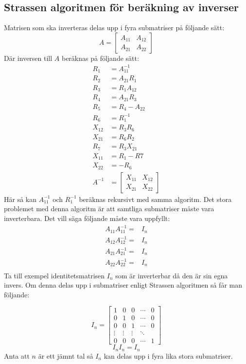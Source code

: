 \subsection{Strassen algoritmen för beräkning av inverser}
\label{sec:inverse_nackdelar}
Matrisen som ska inverteras delas upp i fyra submatriser på följande sätt:
$$A=\begin{bmatrix}
A_{11} & A_{12} \\
A_{21}& A_{22}
 \end{bmatrix}
 $$
 Där inversen till $A$ beräknas på följande sätt\citep{Petkovic2013}:
 \begin{align}
  R_1 & =A_{11}^{-1} \\
  R_2 & =A_{21}R_1 \\
  R_3 & =R_1A_{12} \\
  R_4 & =A_{21}R_3 \\
  R_5 & =R_4 -A_{22} \\
  R_6 & =R_1^{-1} \\
  X_{12} & =R_3R_6 \\
  X_{21} & =R_6R_2 \\
  R_7 & =R_3X_{21} \\
  X_{11} & =R_1 -R7 \\
  X_{22} & =-R_6 \\
 A^{-1} & =\begin{bmatrix}
X_{11} & X_{12} \\
X_{21}& X_{22}
 \end{bmatrix}
 \end{align}
 Här så kan $A_{11}^{-1}$ och $R_1^{-1}$ beräknas rekursivt med samma algoritm. Det stora problemet med denna algoritm är att samtliga submatriser måste vara inverterbara. Det vill säga följande måste vara uppfyllt:
 \begin{align}
   A_{11}A_{11}^{-1}= & I_n \\
   A_{12}A_{12}^{-1}= & I_n \\
   A_{21}A_{21}^{-1}= & I_n \\
   A_{22}A_{22}^{-1}= & I_n \\
 \end{align}
 Ta till exempel identitetsmatrisen $I_n$ som är inverterbar då den är sin egna invers. Om denna delas upp i submatriser enligt Strassen algoritmen så får man följande:
 
 $$ I_n =
 \begin{bmatrix}
   1 & 0 & 0 & \cdots & 0 \\
  0 & 1 & 0 & \cdots & 0 \\
  0 & 0 & 1 & \cdots & 0 \\
  \vdots  & \vdots  & \vdots & \ddots  \\
  0 & 0 & 0 & \cdots & 1
 \end{bmatrix}
 $$
 $$I_nI_n=I_n$$
 Anta att $n$ är ett jämnt tal så $I_n$ kan delas upp i fyra lika stora submatriser.
 
